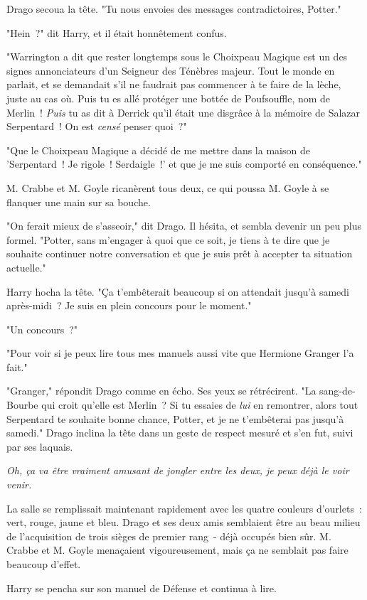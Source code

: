 Drago secoua la tête. "Tu nous envoies des messages contradictoires, Potter."

"Hein~?" dit Harry, et il était honnêtement confus.

"Warrington a dit que rester longtemps sous le Choixpeau Magique est un des signes annonciateurs d'un Seigneur des Ténèbres majeur. Tout le monde en parlait, et se demandait s'il ne faudrait pas commencer à te faire de la lèche, juste au cas où. Puis tu es allé protéger une bottée de Poufsouffle, nom de Merlin~! \emph{Puis} tu as dit à Derrick qu'il était une disgrâce à la mémoire de Salazar Serpentard~! On est \emph{censé} penser quoi~?"

"Que le Choixpeau Magique a décidé de me mettre dans la maison de 'Serpentard~! Je rigole~! Serdaigle~!' et que je me suis comporté en conséquence."

M. Crabbe et M. Goyle ricanèrent tous deux, ce qui poussa M. Goyle à se flanquer une main sur sa bouche.

"On ferait mieux de s'asseoir," dit Drago. Il hésita, et sembla devenir un peu plus formel. "Potter, sans m'engager à quoi que ce soit, je tiens à te dire que je souhaite continuer notre conversation et que je suis prêt à accepter ta situation actuelle."

Harry hocha la tête. "Ça t'embêterait beaucoup si on attendait jusqu'à samedi après-midi~? Je suis en plein concours pour le moment."

"Un concours~?"

"Pour voir si je peux lire tous mes manuels aussi vite que Hermione Granger l'a fait."

"Granger," répondit Drago comme en écho. Ses yeux se rétrécirent. "La sang-de-Bourbe qui croit qu'elle est Merlin~? Si tu essaies de \emph{lui} en remontrer, alors tout Serpentard te souhaite bonne chance, Potter, et je ne t'embêterai pas jusqu'à samedi." Drago inclina la tête dans un geste de respect mesuré et s'en fut, suivi par ses laquais.

\emph{Oh, ça va être vraiment amusant de jongler entre les deux, je peux déjà le voir venir.}

La salle se remplissait maintenant rapidement avec les quatre couleurs d'ourlets~: vert, rouge, jaune et bleu. Drago et ses deux amis semblaient être au beau milieu de l'acquisition de trois sièges de premier rang~- déjà occupés bien sûr. M. Crabbe et M. Goyle menaçaient vigoureusement, mais ça ne semblait pas faire beaucoup d'effet.

Harry se pencha sur son manuel de Défense et continua à lire.


